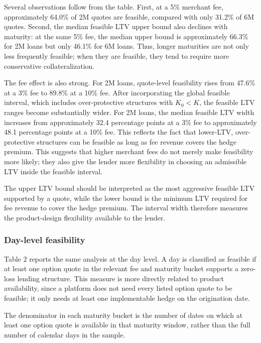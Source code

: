 \documentclass[11pt]{article}
\begin{document}
Several observations follow from the table. First, at a 5\% merchant fee, approximately 64.0\% of 2M quotes are feasible, compared with only 31.2\% of 6M quotes. Second, the median feasible LTV upper bound also declines with maturity: at the same 5\% fee, the median upper bound is approximately 66.3\% for 2M loans but only 46.1\% for 6M loans. Thus, longer maturities are not only less frequently feasible; when they are feasible, they tend to require more conservative collateralization.

The fee effect is also strong. For 2M loans, quote-level feasibility rises from 47.6\% at a 3\% fee to 89.8\% at a 10\% fee. After incorporating the global feasible interval, which includes over-protective structures with $K_0<K$, the feasible LTV ranges become substantially wider. For 2M loans, the median feasible LTV width increases from approximately 32.4 percentage points at a 3\% fee to approximately 48.1 percentage points at a 10\% fee. This reflects the fact that lower-LTV, over-protective structures can be feasible as long as fee revenue covers the hedge premium. This suggests that higher merchant fees do not merely make feasibility more likely; they also give the lender more flexibility in choosing an admissible LTV inside the feasible interval.

The upper LTV bound should be interpreted as the most aggressive feasible LTV supported by a quote, while the lower bound is the minimum LTV required for fee revenue to cover the hedge premium. The interval width therefore measures the product-design flexibility available to the lender.

\subsubsection{Day-level feasibility}

Table 2 reports the same analysis at the day level. A day is classified as feasible if at least one option quote in the relevant fee and maturity bucket supports a zero-loss lending structure. This measure is more directly related to product availability, since a platform does not need every listed option quote to be feasible; it only needs at least one implementable hedge on the origination date.

The denominator in each maturity bucket is the number of dates on which at least one option quote is available in that maturity window, rather than the full number of calendar days in the sample.
\end{document}
